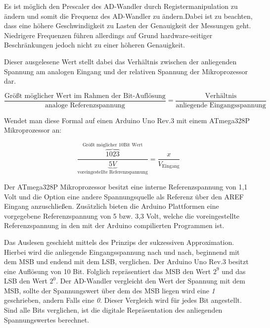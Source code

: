 Es ist  möglich den Prescaler des AD-Wandler durch Registermanipulation zu ändern\cite{atmelcorporationatmega48apa88apa168apa328p2014} und somit die Frequenz des AD-Wandler zu ändern.Dabei ist zu beachten, dass eine höhere Geschwindigkeit zu Lasten der Genauigkeit der Messungen geht. Niedrigere Frequenzen führen allerdings auf Grund hardware-seitiger Beschränkungen jedoch nicht zu einer höheren Genauigkeit.

Dieser ausgelesene Wert stellt dabei das Verhältnis zwischen der anliegenden Spannung am analogen Eingang und der relativen Spannung der Mikroprozessor dar.
\begin{center}
  \begin{equation}
  \label{eq: Formel zur Berechnung der anligenden Spannung in Relation zur Referenzspannung}
    \frac{\text{Größt möglicher Wert im Rahmen der Bit-Auflösung}}{\text{analoge Referenzspannung}} = \frac{\text{Verhältnis}}{\text{anliegende Eingangsspannung}}
  \end{equation}
\end{center}

Wendet man diese Formal auf einen Arduino Uno Rev.3 mit einem ATmega328P Mikroprozessor an:
\begin{center}
  \begin{equation}
      \frac{\overbrace{1023}^\text{Größt möglicher 10Bit Wert}}{\underbrace{5V}_\text{voreingestellte Referenzspannung}} = \frac{x}{V_\text{Eingang}}
  \end{equation}
\end{center}
Der ATmega328P Mikroprozessor besitzt eine interne Referenzspannung von 1,1 Volt und die Option eine andere Spannungsquelle als Referenz über den AREF Eingang anzuschließen\cite{atmelcorporationatmega48apa88apa168apa328p2014}. Zusätzlich bieten die Arduino Plattformen eine vorgegebene Referenzspannung von 5 bzw. 3,3 Volt\cite{arduino2015-1}, welche die voreingestellte Referenzspannung in den mit der Arduino  compilierten Programmen ist.


Das Auslesen geschieht mittels des Prinzips der sukzessiven Approximation. Hierbei wird die anliegende Eingangsspannung nach und nach, beginnend mit dem MSB und endend mit dem LSB, verglichen. Der Arduino Uno Rev.3 besitzt eine Auflösung von 10 Bit. Folglich repräsentiert das MSB den Wert $2^{9}$ und das LSB den Wert $2^{0}$.
Der AD-Wandler vergleicht den Wert der Spannung mit dem MSB, sollte der Spannungswert über dem des MSB liegen wird eine \textit{1} geschrieben, andern Falls eine \textit{0}. Dieser Vergleich wird für jedes Bit angestellt. Sind alle Bits verglichen, ist die digitale Repräsentation des anliegenden Spannungswertes berechnet.


